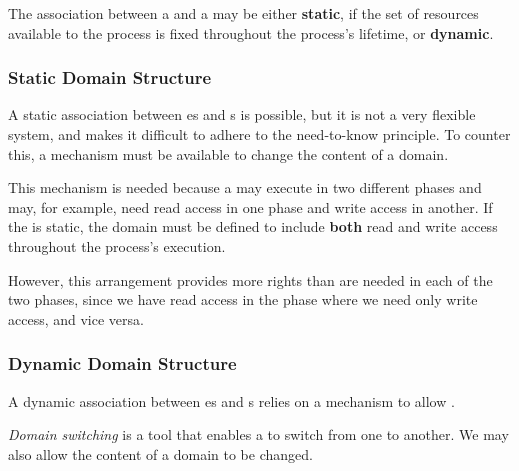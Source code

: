 The association between a  and a  may be either \textbf{static}, if the set of resources available to the process is fixed throughout the process’s lifetime, or \textbf{dynamic}.

\subsubsection{Static Domain Structure}\label{subsubsec:Static_Domain_Structure}
A static association between es and s is possible, but it is not a very flexible system, and makes it difficult to adhere to the need-to-know principle.
To counter this, a mechanism must be available to change the content of a domain.

This mechanism is needed because a  may execute in two different phases and may, for example, need read access in one phase and write access in another.
If the  is static, the domain must be defined to include \textbf{both} read and write access throughout the process's execution.

However, this arrangement provides more rights than are needed in each of the two phases, since we have read access in the phase where we need only write access, and vice versa.

\subsubsection{Dynamic Domain Structure}\label{subsubsec:Dynamic_Domain_Structure}
A dynamic association between es and s relies on a mechanism to allow .

\begin{definition}\label{def:Domain_Switching}
  \emph{Domain switching} is a tool that enables a  to switch from one  to another.
  We may also allow the content of a domain to be changed.
\end{definition}

